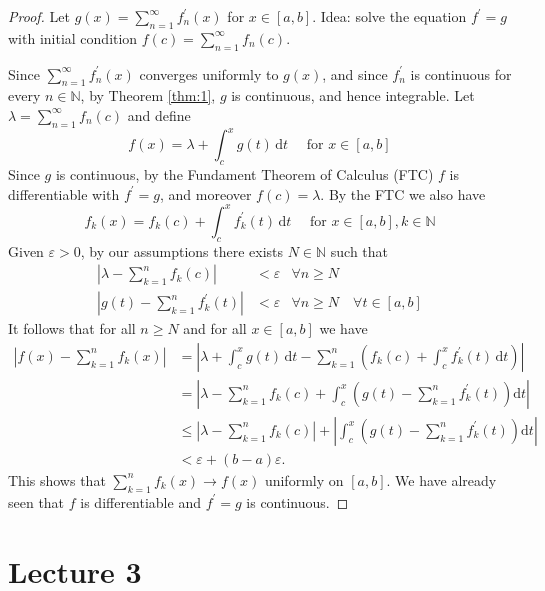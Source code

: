 \documentclass[a4paper]{article}
\begin{document}
\begin{proof}
    Let $g(x)=\sum_{n=1}^{\infty} f_{n}^{\prime}(x)$ for $x \in[a, b]$. Idea: solve the equation $f^{\prime}=g$ with initial condition $f(c)=\sum_{n=1}^{\infty} f_{n}(c)$.

    Since $\sum_{n=1}^{\infty} f_{n}^{\prime}(x)$ converges uniformly to $g(x)$, and since $f_{n}^{\prime}$ is continuous for every $n \in \mathbb{N}$, by Theorem \ref{thm:1}, $ g$ is continuous, and hence integrable. Let $\lambda=\sum_{n=1}^{\infty} f_{n}(c)$ and define
    \[
    f(x)=\lambda+\int_{c}^{x} g(t)\, \mathrm{d} t \quad \text { for } x \in[a, b]
    \]
    Since $g$ is continuous, by the Fundament Theorem of Calculus (FTC) $f$ is differentiable with $f^{\prime}=g$, and moreover $f(c)=\lambda$. By the FTC we also have
    \[
    f_{k}(x)=f_{k}(c)+\int_{c}^{x} f_{k}^{\prime}(t)\, \mathrm{d} t \quad \text { for } x \in[a, b], k \in \mathbb{N}
    \]
    Given $\varepsilon>0$, by our assumptions there exists $N \in \mathbb{N}$ such that
    \[
    \begin{array}{rll}
    \displaystyle \left|\lambda-\sum_{k=1}^{n} f_{k}(c)\right| & <\varepsilon & \forall n \geqslant N \\[15pt]
    \displaystyle \left|g(t)-\sum_{k=1}^{n} f_{k}^{\prime}(t)\right| & <\varepsilon & \forall n \geqslant N \quad \forall t \in[a, b]
    \end{array}
    \]
    It follows that for all $n \geqslant N$ and for all $x \in[a, b]$ we have
    \[
    \begin{aligned}
    \left|f(x)-\sum_{k=1}^{n} f_{k}(x)\right| &=\left|\lambda+\int_{c}^{x} g(t)\, \mathrm{d} t-\sum_{k=1}^{n}\left(f_{k}(c)+\int_{c}^{x} f_{k}^{\prime}(t) \,\mathrm{d} t\right)\right| \\
    &=\left|\lambda-\sum_{k=1}^{n} f_{k}(c)+\int_{c}^{x}\left(g(t)-\sum_{k=1}^{n} f_{k}^{\prime}(t)\right) \mathrm{d} t\right| \\
    & \leqslant\left|\lambda-\sum_{k=1}^{n} f_{k}(c)\right|+\left|\int_{c}^{x}\left(g(t)-\sum_{k=1}^{n} f_{k}^{\prime}(t)\right) \mathrm{d} t\right| \\
    &<\varepsilon+(b-a) \varepsilon.
    \end{aligned}
    \]
    This shows that $\sum_{k=1}^{n} f_{k}(x) \rightarrow f(x)$ uniformly on $[a, b]$. We have already seen that $f$ is differentiable and $f^{\prime}=g$ is continuous.
\end{proof}
\newpage
\part*{Lecture 3}
\end{document}
